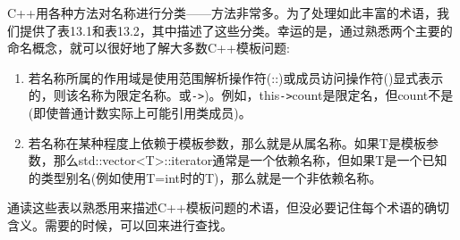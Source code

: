 C++用各种方法对名称进行分类——方法非常多。为了处理如此丰富的术语，我们提供了表13.1和表13.2，其中描述了这些分类。幸运的是，通过熟悉两个主要的命名概念，就可以很好地了解大多数C++模板问题:

\begin{enumerate}
\item 
若名称所属的作用域是使用范围解析操作符(::)或成员访问操作符()显式表示的，则该名称为限定名称。或\texttt{->})。例如，this\texttt{->}count是限定名，但count不是(即使普通计数实际上可能引用类成员)。

\item 
若名称在某种程度上依赖于模板参数，那么就是从属名称。如果T是模板参数，那么std::vector<T>::iterator通常是一个依赖名称，但如果T是一个已知的类型别名(例如使用T=int时的T)，那么就是一个非依赖名称。
\end{enumerate}

通读这些表以熟悉用来描述C++模板问题的术语，但没必要记住每个术语的确切含义。需要的时候，可以回来进行查找。


